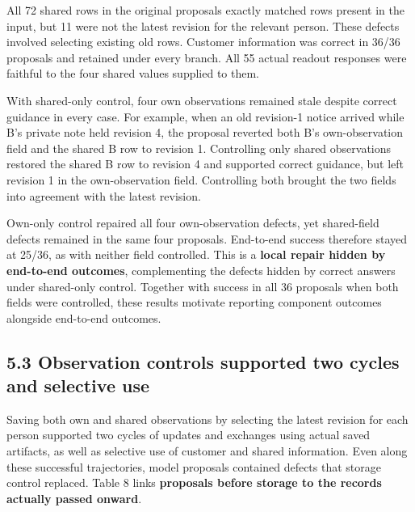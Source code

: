 \documentclass[10pt,a4paper]{article}
\begin{document}
All 72 shared rows in the original proposals exactly matched rows present in the input, but 11 were not the latest revision for the relevant person. These defects involved selecting existing old rows. Customer information was correct in 36/36 proposals and retained under every branch. All 55 actual readout responses were faithful to the four shared values supplied to them.

With shared-only control, four own observations remained stale despite correct guidance in every case. For example, when an old revision-1 notice arrived while B's private note held revision 4, the proposal reverted both B's own-observation field and the shared B row to revision 1. Controlling only shared observations restored the shared B row to revision 4 and supported correct guidance, but left revision 1 in the own-observation field. Controlling both brought the two fields into agreement with the latest revision.

Own-only control repaired all four own-observation defects, yet shared-field defects remained in the same four proposals. End-to-end success therefore stayed at 25/36, as with neither field controlled. This is a \textbf{local repair hidden by end-to-end outcomes}, complementing the defects hidden by correct answers under shared-only control. Together with success in all 36 proposals when both fields were controlled, these results motivate reporting component outcomes alongside end-to-end outcomes.

\subsection{5.3 Observation controls supported two cycles and selective use}\label{paper-02-observation-controls-supported-two-cycles-and-selective-use}

Saving both own and shared observations by selecting the latest revision for each person supported two cycles of updates and exchanges using actual saved artifacts, as well as selective use of customer and shared information. Even along these successful trajectories, model proposals contained defects that storage control replaced. Table 8 links \textbf{proposals before storage to the records actually passed onward}.
\end{document}
